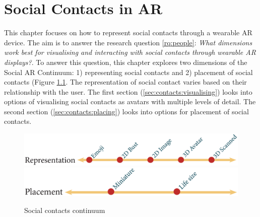 \chapter{Social Contacts in AR}
\label{ch:contacts} 

This chapter focuses on how to represent social contacts through a wearable AR device. The aim is to answer the research question \ref{rq:people}: \textit{What dimensions work best for visualising and interacting with social contacts through wearable AR displays?}. To answer this question, this chapter explores two dimensions of the Social AR Continuum: 1) representing social contacts and 2) placement of social contacts (Figure \ref{fig:contacts:contacts-continuum}. The representation of social contact varies based on their relationship with the user. 
The first section (\ref{sec:contacts:visualising}) looks into options of visualising social contacts as avatars with multiple levels of detail. The second section (\ref{sec:contacts:placing}) looks into options for placement of social contacts. 

\begin{figure}[h]
  \centering
  \includegraphics[width=\columnwidth]{images/continuum/continuum4.2-01.eps}
  \includegraphics[width=\columnwidth]{images/continuum/continuum4.2-02.eps}
  \caption{Social contacts continuum}
  \label{fig:contacts:contacts-continuum}
\end{figure}





